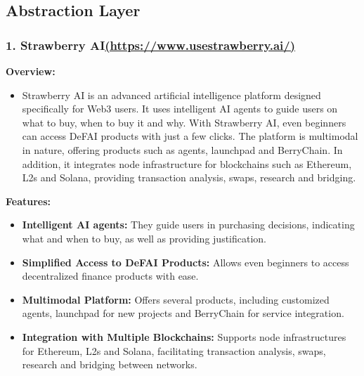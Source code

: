 \documentclass[
]{article}
\providecommand{\tightlist}{%
  \setlength{\itemsep}{0pt}\setlength{\parskip}{0pt}}
\begin{document}
\hypertarget{abstraction-layer}{%
\subsection{Abstraction Layer}\label{abstraction-layer}}

\hypertarget{strawberry-aihttpswww.usestrawberry.ai}{%
\subsubsection{\texorpdfstring{1. Strawberry
AI\href{https://www.usestrawberry.ai/}{(https://www.usestrawberry.ai/)}}{1. Strawberry AI(https://www.usestrawberry.ai/)}}\label{strawberry-aihttpswww.usestrawberry.ai}}

\textbf{Overview:}

\begin{itemize}
\tightlist
\item
  Strawberry AI is an advanced artificial intelligence platform designed
  specifically for Web3 users. It uses intelligent AI agents to guide
  users on what to buy, when to buy it and why. With Strawberry AI, even
  beginners can access DeFAI products with just a few clicks. The
  platform is multimodal in nature, offering products such as agents,
  launchpad and BerryChain. In addition, it integrates node
  infrastructure for blockchains such as Ethereum, L2s and Solana,
  providing transaction analysis, swaps, research and bridging.
\end{itemize}

\textbf{Features:}

\begin{itemize}
\tightlist
\item
  \textbf{Intelligent AI agents:} They guide users in purchasing
  decisions, indicating what and when to buy, as well as providing
  justification.
\item
  \textbf{Simplified Access to DeFAI Products:} Allows even beginners to
  access decentralized finance products with ease.
\item
  \textbf{Multimodal Platform:} Offers several products, including
  customized agents, launchpad for new projects and BerryChain for
  service integration.
\item
  \textbf{Integration with Multiple Blockchains:} Supports node
  infrastructures for Ethereum, L2s and Solana, facilitating transaction
  analysis, swaps, research and bridging between networks.
\end{itemize}
\end{document}

